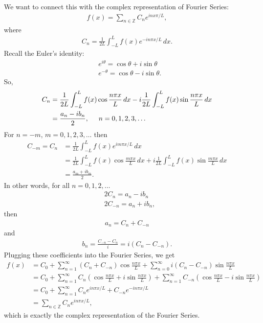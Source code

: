 \documentclass{article}
\theoremstyle{definition}
\begin{document}
We want to connect this with the complex representation of Fourier Series:
\begin{align*}
f(x) = \sum_{n\in \mathbb{Z}} C_n e^{inx\pi/L},
\end{align*}
where 
\begin{align*}
C_n = \frac{1}{2L}\int^L_{-L}f(x)e^{-in\pi x/L}\,dx.
\end{align*}
Recall the Euler's identity:
\begin{align*}
&e^{i\theta} = \cos\theta + i\sin\theta\\
&e^{-\theta} = \cos\theta - i\sin\theta.
\end{align*}
So,
\begin{align*}
C_n &= \frac{1}{2L}\int^L_{-L}f(x)\cos\frac{n\pi x}{L}\,dx - i\frac{1}{2L}\int^L_{-L}f(x)\sin\frac{n\pi x}{L}\,dx\\
&= \frac{a_n - ib_n}{2},\hspace{0.5cm}n=0,1,2,3,\dots
\end{align*}
For $n=-m$, $m=0,1,2,3,\dots$ then
\begin{align*}
C_{-m} = C_n &= \frac{1}{2L}\int^L_{-L}f(x)e^{im\pi x/L}\,dx\\
&= \frac{1}{2L}\int^L_{-L}f(x)\cos\frac{m\pi x}{L}\,dx + i\frac{1}{2L}\int^L_{-L}f(x)\sin\frac{m\pi x}{L}\,dx\\
&= \frac{a_m + ib_m}{2}.
\end{align*}
In other words, for all $n=0,1,2,\dots$
\begin{align*}
&2C_n = a_n - ib_n\\
&2C_{-n} = a_n + ib_n,
\end{align*}
then
\begin{align*}
a_n = C_n + C_{-n}
\end{align*}
and
\begin{align*}
b_n = \frac{C_{-n} - C_n}{i} = i(C_n - C_{-n}).
\end{align*}
Plugging these coefficients into the Fourier Series, we get
\begin{align*}
f(x) &= C_0 + \sum^\infty_{n=1}(C_n + C_{-n})\cos\frac{n\pi x}{L} + \sum^\infty_{n=0}i(C_n - C_{-n})\sin\frac{n\pi x}{L}\\
&= C_0 + \sum^\infty_{n=1}C_n\left(\cos\frac{n\pi x}{L} + i\sin\frac{n\pi x}{L}\right) + \sum^\infty_{n=1}C_{-n}\left(\cos\frac{n\pi x}{L} - i\sin\frac{n\pi x}{L}\right)\\
&= C_0 + \sum^\infty_{n=1}C_ne^{in\pi x/L} + C_{-n}e^{-in\pi x/L}\\
&= \sum_{n\in \mathbb{Z}}C_ne^{in\pi x/L},
\end{align*}
which is exactly the complex representation of the Fourier Series. \\
\end{document}
